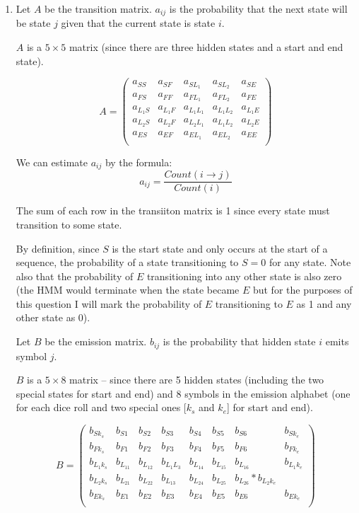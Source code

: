 \documentclass[10pt, a4paper]{article}
\begin{document}

\begin{enumerate}[label=(\alph*)]

\item 

Let $A$ be the transition matrix. $a_{ij}$ is the probability that the next state will be state $j$ given that 
the current state is state $i$.

$A$ is a $5\times5$ matrix (since there are three hidden states and a start and end state).

\[
A = 
\begin{pmatrix}
a_{SS} & a_{SF} & a_{SL_1} & a_{SL_2} & a_{SE} \\
a_{FS} & a_{FF} & a_{FL_1} & a_{FL_2} & a_{FE} \\
a_{L_1S} & a_{L_1F} & a_{L_1L_1} & a_{L_1L_2} & a_{L_1E} \\
a_{L_2S} & a_{L_2F} & a_{L_2L_1} & a_{L_1L_2} & a_{L_2E} \\
a_{ES} & a_{EF} & a_{EL_1} & a_{EL_2} & a_{EE} \\
\end{pmatrix}
\]

We can estimate $a_{ij}$ by the formula:
\[
a_{ij} = \frac{\mathit{Count}(i \rightarrow j)}{\mathit{Count}(i)}
\]

The sum of each row in the transiiton matrix is 1 since every state must transition to some state.

By definition, since $S$ is the start state and only occurs at the start of a sequence, the probability of 
a state transitioning to $S = 0$ for any state. Note also that the probability of $E$ transitioning into any 
other state is also zero (the HMM would terminate when the state became $E$ but for the purposes of this question 
I will mark the probability of $E$ transitioning to $E$ as 1 and any other state as 0).

Let $B$ be the emission matrix. $b_{ij}$ is the probability that hidden state $i$ emits symbol $j$. 

$B$ is a $5 \times 8$ matrix -- since there are 5 hidden states (including the two special states for start 
and end) and 8 symbols in the emission alphabet (one for each dice roll and two special ones [$k_s$ and $k_e$] for start and end).

\[
B = 
\begin{pmatrix}
b_{Sk_s} & b_{S1} & b_{S2} & b_{S3} & b_{S4} & b_{S5} & b_{S6} & b_{Sk_e} \\
b_{Fk_s} & b_{F1} & b_{F2} & b_{F3} & b_{F4} & b_{F5} & b_{F6} & b_{Fk_e} \\
b_{L_1k_s} & b_{L_11} & b_{L_12} & b_{L_1L_3} & b_{L_14} & b_{L_15} & b_{L_16} & b_{L_1k_e}\\
b_{L_2k_s} & b_{L_21} & b_{L_22} & b_{L_13} & b_{L_24} & b_{L_25} & b_{L_26} * b_{L_2k_e}\\
b_{Ek_s} & b_{E1} & b_{E2} & b_{E3} & b_{E4} & b_{E5} & b_{E6} & b_{Ek_e}\\
\end{pmatrix}
\]


\end{enumerate}
\end{document}
